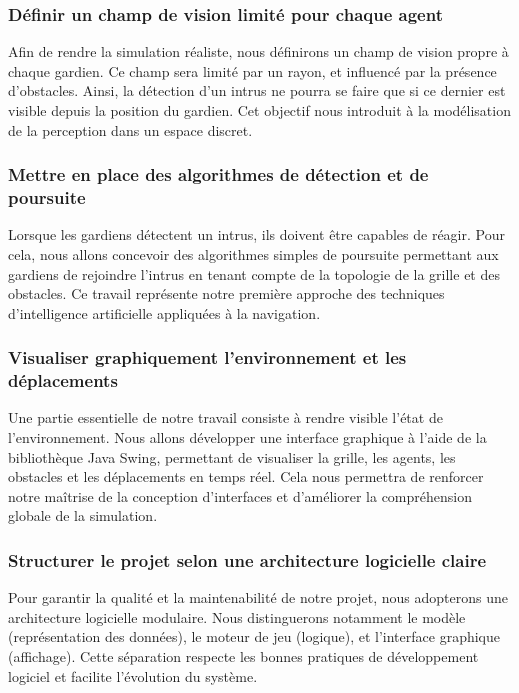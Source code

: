 \subsubsection{ Définir un champ de vision limité pour chaque agent}

Afin de rendre la simulation réaliste, nous définirons un champ de vision propre à chaque gardien. Ce champ sera limité par un rayon, et influencé par la présence d’obstacles. Ainsi, la détection d’un intrus ne pourra se faire que si ce dernier est visible depuis la position du gardien. Cet objectif nous introduit à la modélisation de la perception dans un espace discret.

\subsubsection{Mettre en place des algorithmes de détection et de poursuite}

Lorsque les gardiens détectent un intrus, ils doivent être capables de réagir. Pour cela, nous allons concevoir des algorithmes simples de poursuite permettant aux gardiens de rejoindre l’intrus en tenant compte de la topologie de la grille et des obstacles. Ce travail représente notre première approche des techniques d’intelligence artificielle appliquées à la navigation.

\subsubsection{ Visualiser graphiquement l’environnement et les déplacements}

Une partie essentielle de notre travail consiste à rendre visible l’état de l’environnement. Nous allons développer une interface graphique à l’aide de la bibliothèque Java Swing, permettant de visualiser la grille, les agents, les obstacles et les déplacements en temps réel. Cela nous permettra de renforcer notre maîtrise de la conception d’interfaces et d’améliorer la compréhension globale de la simulation.

\subsubsection{ Structurer le projet selon une architecture logicielle claire}

Pour garantir la qualité et la maintenabilité de notre projet, nous adopterons une architecture logicielle modulaire. Nous distinguerons notamment le modèle (représentation des données), le moteur de jeu (logique), et l’interface graphique (affichage). Cette séparation respecte les bonnes pratiques de développement logiciel et facilite l’évolution du système.

